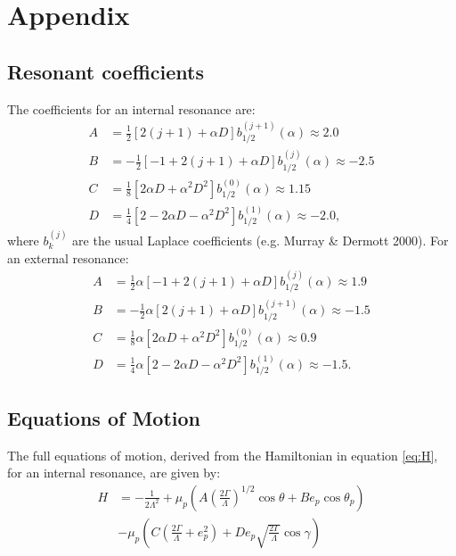 \documentclass{article}
\begin{document}
\section{Appendix}
\subsection{Resonant coefficients}\label{app:coeff}
The coefficients for an internal resonance are:
  \begin{align*}
    A &=  \frac12[2(j+1)+\alpha D]b_{1/2}^{(j+1)}(\alpha) \approx 2.0 \\
    B &= -\frac12[-1+2(j+1)+\alpha D]b_{1/2}^{(j)}(\alpha) \approx -2.5\\
    C &= \frac18[2\alpha D + \alpha^2 D^2]b_{1/2}^{(0)}(\alpha) \approx 1.15\\
    D &= \frac14[2-2\alpha D - \alpha^2 D^2]b_{1/2}^{(1)}(\alpha)\approx -2.0,
  \end{align*}
  where $b_{k}^{(j)}$ are the usual Laplace coefficients (e.g. Murray \& Dermott 2000).
For an external resonance:
\begin{align*}
    A &= \frac12\alpha[-1+2(j+1)+\alpha D]b_{1/2}^{(j)}(\alpha) \approx 1.9\\
    B &=  -\frac12\alpha[2(j+1)+\alpha D]b_{1/2}^{(j+1)}(\alpha) \approx -1.5 \\
    C &= \frac18\alpha[2\alpha D + \alpha^2 D^2]b_{1/2}^{(0)}(\alpha) \approx 0.9\\
    D &= \frac14\alpha[2-2\alpha D - \alpha^2 D^2]b_{1/2}^{(1)}(\alpha)\approx -1.5. 
  \end{align*}
\subsection{Equations of Motion}\label{app:eom}
The full equations of motion, derived from the Hamiltonian in equation \ref{eq:H},
for an internal resonance, are given by:
\begin{align*}
  H
  &= - \frac{1}{2\Lambda^2} + \mu_p\left(A
    \left(\frac{2\Gamma}{\Lambda}\right)^{1/2}\cos\theta + B
    e_p\cos\theta_p\right) \\
  &- \mu_p \left(C\left(\frac{2\Gamma}{\Lambda}
      + e_p^2\right) + De_p
    \sqrt{\frac{2\Gamma}{\Lambda}}\cos\gamma\right)
\end{align*}
\end{document}
